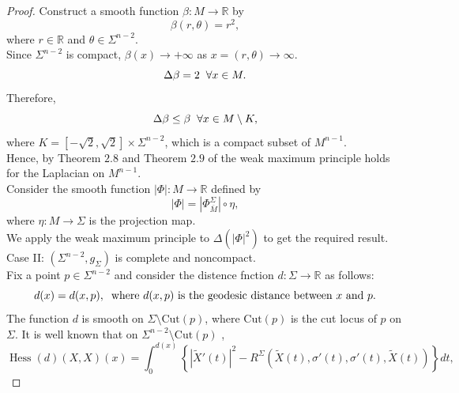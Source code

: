 \documentclass[11pt]{amsart}
\DeclareMathOperator{\Hessian}{Hess}
\numberwithin{equation}{section}
\begin{document}
\begin{proof}
Construct a smooth function $\beta: M\rightarrow \mathbb{R}$ by 
\begin{equation}\label{FE26}
    \beta(r, \theta)=r^2,
\end{equation}
where $r\in \mathbb{R}$ and $\theta\in \Sigma^{n-2}$.\\
Since $\Sigma^{n-2}$ is compact, $\beta(x)\rightarrow +\infty$ as $x=(r, \theta)\rightarrow \infty$.\\
\begin{equation*}
    \Delta \beta=2 \hspace{2mm} \forall x\in M.
\end{equation*}
Therefore, 
\begin{equation*}
    \Delta \beta\le \beta \hspace{2mm} \forall x\in M\setminus K,
\end{equation*}
where $K=[-\sqrt 2, \sqrt 2]\times \Sigma^{n-2}$, which is a compact subset of $M^{n-1}$.\\
Hence, by Theorem $2.8$ and Theorem $2.9$ of \cite{aliasbook} the weak maximum principle holds for the Laplacian on $M^{n-1}$.\\
Consider the smooth function $|\Phi|:M\rightarrow \mathbb{R}$ defined by
\begin{equation}
    |\Phi|=|\Phi^{\Sigma}_{\overline{M}}|\circ \eta,
\end{equation}
where $\eta: M\rightarrow \Sigma$ is the projection map.\\
We apply the weak maximum principle to $\Delta (|\Phi|^2)$ to get the required result.\\
Case II: $(\Sigma^{n-2}, g_{\Sigma})$ is complete and  noncompact.\\
Fix a point $p\in \Sigma^{n-2}$ and consider the distence fnction $d: \Sigma \rightarrow \mathbb{R}$ as follows:
\begin{equation*}
    d(x)=d(x,p), \hspace{2mm} \text{where $d(x, p)$ is the geodesic distance between $x$ and $p$.}
\end{equation*}
The function $d$ is smooth on $\Sigma\setminus \text{Cut}(p)$, where $\text{Cut}(p)$ is the cut locus of $p$ on $\Sigma$.
It is well known that on $\Sigma^{n-2}\setminus \text{Cut}(p)$   ,
\begin{equation}
    \Hessian (d)(X, X)(x)= \int_0^{d(x)} \left\{|\tilde{X}'(t)|^2-R^{\Sigma}\left( \tilde{X}(t), \sigma'(t), \sigma'(t), \tilde{X}(t)\right)\right\} dt,

\end{equation}
\end{proof}
\end{document}
